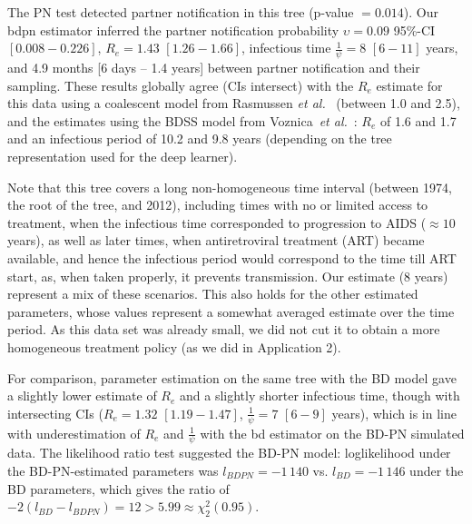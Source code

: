 \documentclass[10pt,letterpaper]{article}
\begin{document}
The PN test detected partner notification in this tree (p-value $=0.014$). Our bdpn estimator inferred the partner notification probability $\upsilon=0.09$ 95\%-CI $[0.008-0.226]$,  
$R_e = 1.43$ $[1.26-1.66]$, infectious time $\frac{1}{\psi} = 8$ $[6-11]$ years, and 4.9 months [6 days -- 1.4 years] between partner notification and their sampling. These results globally agree (CIs intersect) with the $R_e$ estimate for this data using a coalescent model from Rasmussen \textit{et al.}~\cite{Rasmussen2017} (between 1.0 and 2.5), and the estimates using the BDSS model from Voznica~\textit{et al.}~\cite{Voznica2021}: $R_e$ of 1.6 and 1.7 and an infectious period of 10.2 and 9.8 years (depending on the tree representation used for the deep learner).

Note that this tree covers a long non-homogeneous time interval (between 1974, the root of the tree, and 2012), including times with no or limited access to treatment, when the infectious time corresponded to progression to AIDS ($\approx 10$ years), as well as later times, when antiretroviral treatment (ART) became available, and hence the infectious period would correspond to the time till ART start, as, when taken properly, it prevents transmission. Our estimate (8 years) represent a mix of these scenarios. This also holds for the other estimated parameters, whose values represent a somewhat averaged estimate over the time period. As this data set was already small, we did not cut it to obtain a more homogeneous treatment policy (as we did in Application 2).


For comparison, parameter estimation on the same tree with the BD model gave a slightly lower estimate of $R_e$ and a slightly shorter infectious time, though with intersecting CIs ($R_e = 1.32$ $[1.19-1.47]$, $\frac{1}{\psi} = 7$ $[6-9]$ years), which is in line with underestimation of $R_e$ and $\frac{1}{\psi}$ with the bd estimator on the BD-PN simulated data. The likelihood ratio test suggested the BD-PN model: loglikelihood under the BD-PN-estimated parameters was $l_{BDPN} = -1\,140$ vs. $l_{BD}=-1\,146$ under the BD parameters, which gives the ratio of $-2 (l_{BD} - l_{BDPN}) =	12 > 5.99 \approx \chi^2_2(0.95)$. %
\end{document}
